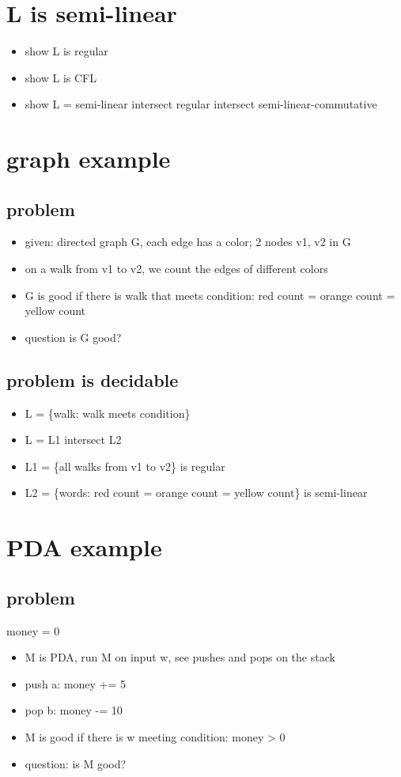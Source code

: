 \documentclass{article}
\begin{document}
\section{L is semi-linear}
\begin{itemize}
	\item show L is regular
	\item show L is CFL
	\item show L = semi-linear intersect regular intersect semi-linear-commutative
\end{itemize}

\section{graph example}

\subsection{problem}
\begin{itemize}
	\item given: directed graph G, each edge has a color; 2 nodes v1, v2 in G
	\item on a walk from v1 to v2, we count the edges of different colors
	\item G is good if there is walk that meets condition: red count = orange count = yellow count
	\item question is G good?
\end{itemize}

\subsection{problem is decidable}
\begin{itemize}
	\item L = \{walk: walk meets condition\}
	\item L = L1 intersect L2
	\item L1 = \{all walks from v1 to v2\} is regular
	\item L2 = \{words: red count = orange count = yellow count\} is semi-linear
\end{itemize}

\section{PDA example}

\subsection{problem}
money = 0
\begin{itemize}
	\item M is PDA, run M on input w, see pushes and pops on the stack
	\item push a: money += 5
	\item pop b: money -= 10
	\item M is good if there is w meeting condition: money > 0
	\item question: is M good?
\end{itemize}
\end{document}
